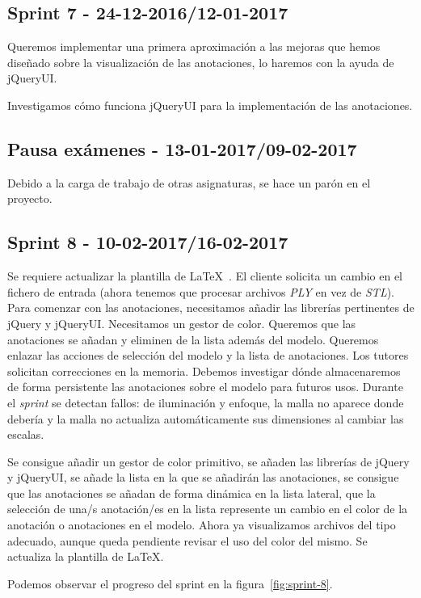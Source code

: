 \subsection{Sprint 7 - 24-12-2016/12-01-2017}
Queremos implementar una primera aproximación a las mejoras que hemos diseñado sobre la visualización de las anotaciones, lo haremos con la ayuda de jQueryUI.

Investigamos cómo funciona jQueryUI para la implementación de las anotaciones.

\subsection{Pausa exámenes - 13-01-2017/09-02-2017}
Debido a la carga de trabajo de otras asignaturas, se hace un parón en el proyecto.

\subsection{Sprint 8 - 10-02-2017/16-02-2017}
Se requiere actualizar la plantilla de \LaTeX~\cite{wiki:latex}. El cliente solicita un cambio en el fichero de entrada (ahora tenemos que procesar archivos \textit{PLY} en vez de \textit{STL}). Para comenzar con las anotaciones, necesitamos añadir las librerías pertinentes de jQuery y jQueryUI. Necesitamos un gestor de color. Queremos que las anotaciones se añadan y eliminen de la lista además del modelo. Queremos enlazar las acciones de selección del modelo y la lista de anotaciones. Los tutores solicitan correcciones en la memoria. Debemos investigar dónde almacenaremos de forma persistente las anotaciones sobre el modelo para futuros usos.
Durante el \textit{sprint} se detectan fallos: de iluminación y enfoque, la malla no aparece donde debería y la malla no actualiza automáticamente sus dimensiones al cambiar las escalas.

Se consigue añadir un gestor de color primitivo, se añaden las librerías de jQuery y jQueryUI, se añade la lista en la que se añadirán las anotaciones, se consigue que las anotaciones se añadan de forma dinámica en la lista lateral, que la selección de una/s anotación/es en la lista represente un cambio en el color de la anotación o anotaciones en el modelo. Ahora ya visualizamos archivos del tipo adecuado, aunque queda pendiente revisar el uso del color del mismo. Se actualiza la plantilla de \LaTeX.

Podemos observar el progreso del sprint en la figura~\ref{fig:sprint-8}.

